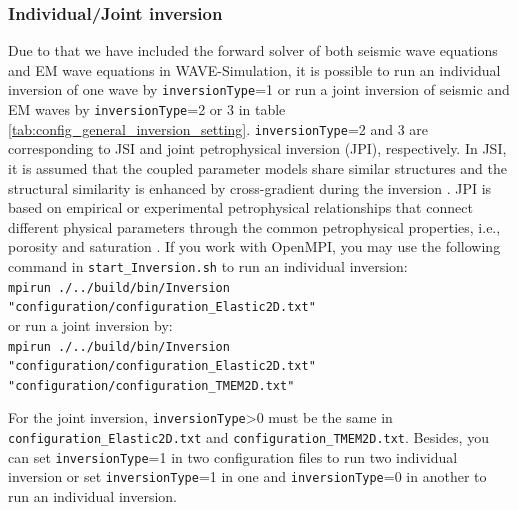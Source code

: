\documentclass[pdftex,a4paper,parskip,listof=totoc,bibliography=totoc,onehalfspacing,12pt]{scrreprt}
\newcommand{\shellcmd}[1]{\indent\indent\texttt{#1}}	%
\newcommand{\shellcmdline}[1]{\indent\indent\texttt{\quad#1}} 	%
\begin{document}
\begin{table}[h!]
\end{table}

\subsubsection{Individual/Joint inversion} 
Due to that we have included the forward solver of both seismic wave equations and EM wave equations in WAVE-Simulation, it is possible to run an individual inversion of one wave by \verb+inversionType+=1 or run a joint inversion of seismic and EM waves by \verb+inversionType+=2 or 3 in table \ref{tab:config_general_inversion_setting}. \verb+inversionType+=2 and 3 are corresponding to JSI and joint petrophysical inversion (JPI), respectively. In JSI, it is assumed that the coupled parameter models share similar structures and the structural similarity is enhanced by cross-gradient during the inversion \citep{gallardo2003characterization}. JPI is based on empirical or experimental petrophysical relationships that connect different physical parameters through the common petrophysical properties, i.e., porosity and saturation \citep{qin2021joint}. If you work with OpenMPI, you may use the following command in \shellcmdline{start\_Inversion.sh} to run an individual inversion:\\
    \shellcmd{mpirun ./../build/bin/Inversion "configuration/configuration\_Elastic2D.txt"}\\
or run a joint inversion by:\\
    \shellcmd{mpirun ./../build/bin/Inversion "configuration/configuration\_Elastic2D.txt" "configuration/configuration\_TMEM2D.txt"}
    
For the joint inversion, \verb+inversionType+>0 must be the same in \shellcmd{configuration\_Elastic2D.txt} and \shellcmd{configuration\_TMEM2D.txt}. Besides, you can set \verb+inversionType+=1 in two configuration files to run two individual inversion or set \verb+inversionType+=1 in one and \verb+inversionType+=0 in another to run an individual inversion.
\end{document}
